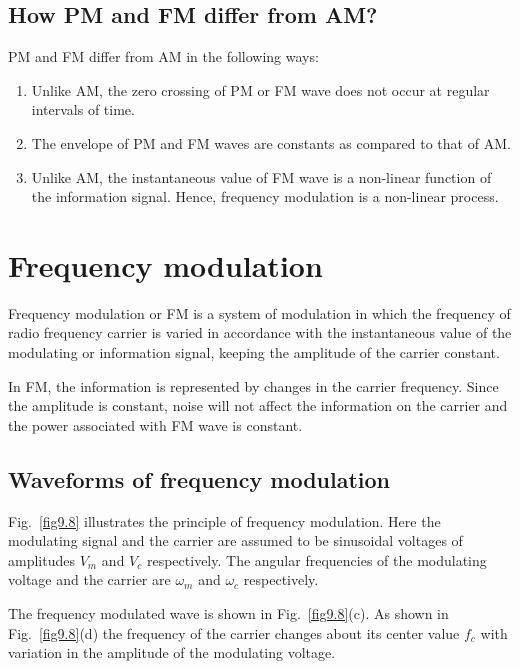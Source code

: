 \subsection{How PM and FM differ from AM?}\label{sec9.17.2}

PM and FM differ from AM in the following ways:
\begin{enumerate}
\item Unlike AM, the zero crossing of PM or FM wave does not occur at regular intervals of time.

\item The envelope of PM and FM waves are constants as compared to that of AM.

\item Unlike AM, the instantaneous value of FM wave is a non-linear function of the information signal. Hence, frequency modulation is a non-linear process.
\end{enumerate}

\section{Frequency modulation}\label{sec9.18}

Frequency modulation or FM is a system of modulation in which the frequency of radio frequency carrier is varied in accordance with the instantaneous value of the modulating or information signal, keeping the amplitude of the carrier constant. 

In FM, the information is represented by changes in the carrier frequency. Since the amplitude is constant, noise will not affect the information on the carrier and the power associated with FM wave is constant.


\subsection{Waveforms of frequency modulation}\label{sec9.18.1}

Fig.~\ref{fig9.8} illustrates the principle of frequency modulation. Here the modulating signal and the carrier are assumed to be sinusoidal voltages of amplitudes $V_{m}$ and $V_{c}$ respectively. The angular frequencies of the modulating voltage and the carrier are $\omega_{m}$ and $\omega_{c}$ respectively.

The frequency modulated wave is shown in Fig.~\ref{fig9.8}(c). As shown in Fig.~\ref{fig9.8}(d) the frequency of the carrier changes about its center value $f_{c}$ with variation in the amplitude of the modulating voltage.

